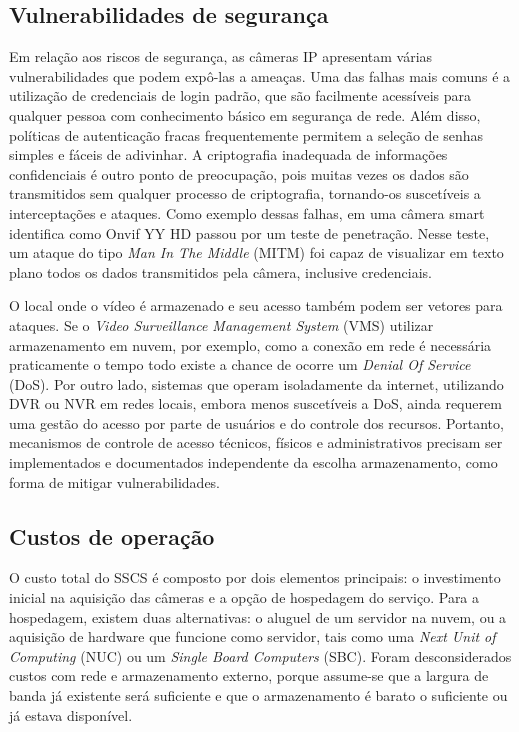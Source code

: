 \documentclass[12pt, %
openright, 
oneside, %
a4paper,    %
brazil]{facom-ufu-abntex2}
\begin{document}
\subsection{Vulnerabilidades de segurança}

Em relação aos riscos de segurança, as câmeras IP apresentam várias
vulnerabilidades que podem expô-las a ameaças. Uma das falhas mais comuns é a
utilização de credenciais de login padrão, que são facilmente acessíveis para
qualquer pessoa com conhecimento básico em segurança de rede. Além disso,
políticas de autenticação fracas frequentemente permitem a seleção de senhas
simples e fáceis de adivinhar. A criptografia inadequada de informações
confidenciais é outro ponto de preocupação, pois muitas vezes os dados são
transmitidos sem qualquer processo de criptografia, tornando-os suscetíveis a
interceptações e ataques. Como exemplo dessas falhas, em 
uma câmera smart identifica como Onvif YY HD passou por um teste de penetração.
Nesse teste, um ataque do tipo \textit{Man In The Middle} (MITM) foi capaz de
visualizar em texto plano todos os dados transmitidos pela câmera, inclusive
credenciais.

O local onde o vídeo é armazenado e seu acesso também podem ser vetores para
ataques. Se o \textit{Video Surveillance Management System} (VMS) utilizar
armazenamento em nuvem, por exemplo, como a conexão em rede é necessária
praticamente o tempo todo existe a chance de ocorre um \textit{Denial Of
	Service} (DoS). Por outro lado, sistemas que operam isoladamente da internet,
utilizando DVR ou NVR em redes locais, embora menos suscetíveis a DoS, ainda
requerem uma gestão do acesso por parte de usuários e do controle dos recursos.
Portanto, mecanismos de controle de acesso técnicos, físicos e administrativos
precisam ser implementados e documentados independente da escolha
armazenamento, como forma de mitigar vulnerabilidades.

\subsection{Custos de operação}

O custo total do SSCS é composto por dois elementos principais: o investimento
inicial na aquisição das câmeras e a opção de hospedagem do serviço. Para a
hospedagem, existem duas alternativas: o aluguel de um servidor na nuvem, ou a
aquisição de hardware que funcione como servidor, tais como uma \textit{Next
	Unit of Computing} (NUC) ou um \textit{Single Board Computers} (SBC). Foram
desconsiderados custos com rede e armazenamento externo, porque assume-se que a
largura de banda já existente será suficiente e que o armazenamento é barato o
suficiente ou já estava disponível.
\end{document}

